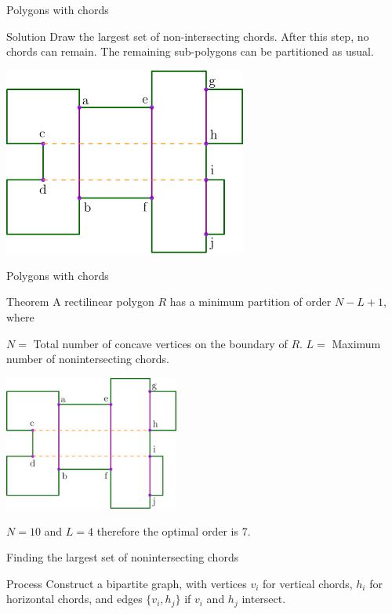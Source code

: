 \documentclass{beamer}
\begin{document}
\begin{frame}[t]{Polygons with chords}	
	\begin{block}{Solution}
	Draw the largest set of non-intersecting chords. 
	After this step, no chords can remain.
    The remaining sub-polygons can be partitioned as usual.  

	\end{block}  
	\vspace{5px}
    \centering
    \includegraphics[width=0.6\textwidth]{intersect1.png}

\end{frame}


\begin{frame}[t]{Polygons with chords}	
	\begin{block}{Theorem}
	A rectilinear polygon $R$ has a minimum partition of order $N - L + 1$, where
	
	
	$N = $ Total number of concave vertices on the boundary of $R$.
	$L = $ Maximum number of nonintersecting chords.

	\end{block}  
	\centering
    \includegraphics[width=0.43\textwidth]{intersect1.png}
    
    $N = 10$ and $L = 4$ therefore the optimal order is 7.

\end{frame}

\begin{frame}[t]{Finding the largest set of nonintersecting chords}	
	\begin{block}{Process}
	Construct a bipartite graph, with vertices $v_i$ for vertical chords, $h_i$ for horizontal chords, and edges $\{v_i, h_j\}$ if $v_i$ and $h_j$ intersect.
	\end{block}

\end{frame}
\end{document}
